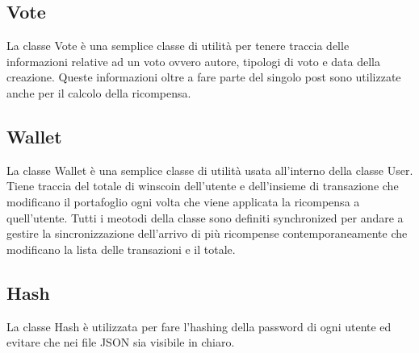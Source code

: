\documentclass[11pt, a4paper, oneside]{article}
\begin{document}
\subsection{Vote}
La classe Vote è una semplice classe di utilità per tenere traccia delle informazioni relative ad un voto ovvero autore, tipologi di voto e data della creazione.
Queste informazioni oltre a fare parte del singolo post sono utilizzate anche per il calcolo della ricompensa.
\subsection{Wallet}
La classe Wallet è una semplice classe di utilità usata all'interno della classe User. Tiene traccia del totale di winscoin dell'utente e dell'insieme di transazione
che modificano il portafoglio ogni volta che viene applicata la ricompensa a quell'utente. Tutti i meotodi della classe sono definiti synchronized per andare a
gestire la sincronizzazione dell'arrivo di più ricompense contemporaneamente che modificano la lista delle transazioni e il totale.
\subsection{Hash}
La classe Hash è utilizzata per fare l'hashing della password di ogni utente ed evitare che nei file JSON sia visibile in chiaro.
\end{document}
